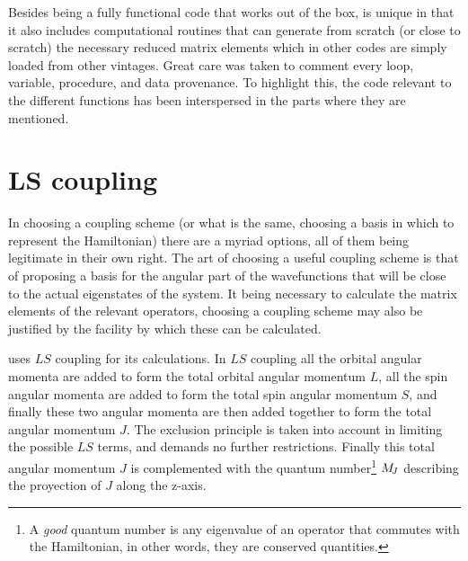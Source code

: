 \documentclass{article}
\begin{document}
Besides being a fully functional code that works out of the box, \qlanth is unique in that it also includes computational routines that can generate from scratch (or close to scratch) the necessary reduced matrix elements which in other codes are simply loaded from other vintages. Great care was taken to comment every loop, variable, procedure, and data provenance. To highlight this, the code relevant to the different functions has been interspersed in the parts where they are mentioned.

\vspace*{\fill}

\newpage

\hypertarget{toc}{}

\vspace*{\fill}

\tableofcontents

\vspace*{\fill}

\newpage

\section{LS coupling}

In choosing a coupling scheme (or what is the same, choosing a basis in which to represent the Hamiltonian) there are a myriad options, all of them being legitimate in their own right. The art of choosing a useful coupling scheme is that of proposing a basis for the angular part of the wavefunctions that will be close to the actual eigenstates of the system. It being necessary to calculate the matrix elements of the relevant operators, choosing a coupling scheme may also be justified by the facility by which these can be calculated.

\qlanth uses $LS$ coupling for its calculations. In $LS$ coupling all the orbital angular momenta are added to form the total orbital angular momentum $L$, all the spin angular momenta are added to form the total spin angular momentum $S$, and finally these two angular momenta are then added together to form the total angular momentum $J$. The exclusion principle is taken into account in limiting the possible $LS$ terms, and demands no further restrictions. Finally this total angular momentum $J$ is complemented with the quantum number\footnote{A \textit{good} quantum number is any eigenvalue of an operator that commutes with the Hamiltonian, in other words, they are conserved quantities.} $M_{\!{J}}$ describing the proyection of $J$ along the z-axis.
\end{document}
